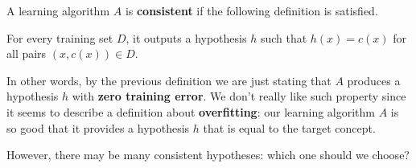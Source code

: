 A learning algorithm $A$ is \textbf{consistent} if the following definition is satisfied.
\begin{definition}
    For every training set $D$, it outputs a hypothesis $h$ such that $h(x) = c(x)$ for all pairs $(x, c(x)) \in D$.
\end{definition}
In other words, by the previous definition we are just stating that $A$ produces a hypothesis $h$ with \textbf{zero training error}. We don't really like 
such property since it seems to describe a definition about \textbf{overfitting}: our learning algorithm $A$ is so good that it provides a hypothesis $h$ that 
is equal to the target concept. \vspace{7pt}

However, there may be many consistent hypotheses: which one should we choose?